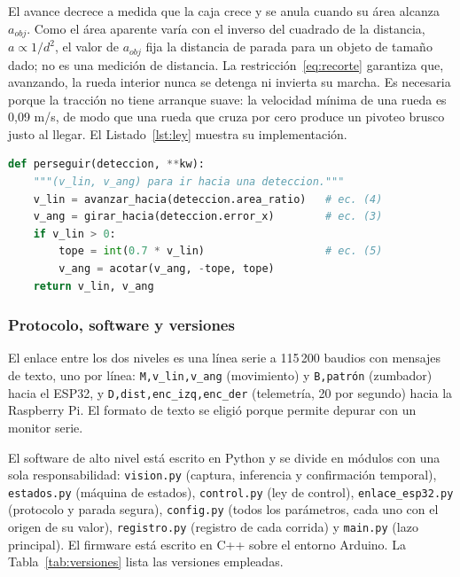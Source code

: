\documentclass[pdflatex,sn-mathphys-num]{sn-jnl}
\newcommand{\cod}[1]{\texttt{#1}}
\begin{document}
El avance decrece a medida que la caja crece y se anula cuando su \'area
alcanza $a_{obj}$. Como el \'area aparente var\'ia con el inverso del cuadrado
de la distancia, $a \propto 1/d^{2}$, el valor de $a_{obj}$ fija la distancia
de parada para un objeto de tama\~no dado; no es una medici\'on de distancia.
La restricci\'on~\eqref{eq:recorte} garantiza que, avanzando, la rueda
interior nunca se detenga ni invierta su marcha. Es necesaria porque la
tracci\'on no tiene arranque suave: la velocidad m\'inima de una rueda es
0,09 m/s, de modo que una rueda que cruza por cero produce un pivoteo brusco
justo al llegar. El Listado~\ref{lst:ley} muestra su implementaci\'on.

\begin{lstlisting}[language=Python,float=htbp,caption={N\'ucleo de la ley de control (versi\'on resumida de \texttt{control.py}).},label={lst:ley}]
def perseguir(deteccion, **kw):
    """(v_lin, v_ang) para ir hacia una deteccion."""
    v_lin = avanzar_hacia(deteccion.area_ratio)   # ec. (4)
    v_ang = girar_hacia(deteccion.error_x)        # ec. (3)
    if v_lin > 0:
        tope = int(0.7 * v_lin)                   # ec. (5)
        v_ang = acotar(v_ang, -tope, tope)
    return v_lin, v_ang
\end{lstlisting}

\subsubsection{Protocolo, software y versiones}

El enlace entre los dos niveles es una l\'inea serie a 115\,200 baudios con
mensajes de texto, uno por l\'inea: \cod{M,v\_lin,v\_ang} (movimiento) y
\cod{B,patr\'on} (zumbador) hacia el ESP32, y \cod{D,dist,enc\_izq,enc\_der}
(telemetr\'ia, 20 por segundo) hacia la Raspberry Pi. El formato de texto se
eligi\'o porque permite depurar con un monitor serie.

El software de alto nivel est\'a escrito en Python y se divide en m\'odulos con
una sola responsabilidad: \cod{vision.py} (captura, inferencia y
confirmaci\'on temporal), \cod{estados.py} (m\'aquina de estados),
\cod{control.py} (ley de control), \cod{enlace\_esp32.py} (protocolo y parada
segura), \cod{config.py} (todos los par\'ametros, cada uno con el origen de su
valor), \cod{registro.py} (registro de cada corrida) y \cod{main.py} (lazo
principal). El firmware est\'a escrito en C++ sobre el entorno Arduino. La
Tabla~\ref{tab:versiones} lista las versiones empleadas.
\end{document}
